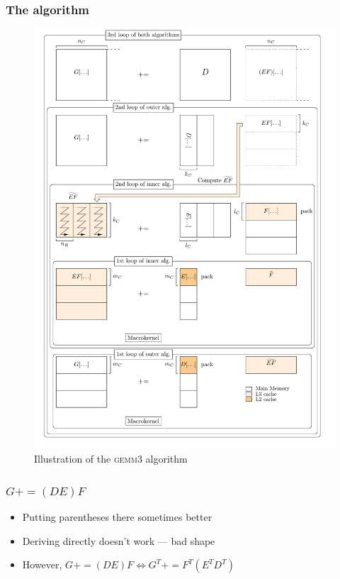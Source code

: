 \documentclass{beamer}
\newcommand*{\pluseq}{\mathrel{{+}{=}}}
\newcommand*{\gemmt}{{\textsc{gemm3}}}
\begin{document}
\begin{frame}
  \frametitle{The algorithm}
  \begin{figure}
    \centering
    \includegraphics[height=0.875\textheight]{gemm3-picture}
    \caption{Illustration of the \gemmt{} algorithm}
    \label{fig:gemm3}
\end{figure}
\end{frame}

\begin{frame}
  \frametitle{$G \pluseq (DE)F$}
    \begin{adjustbox}{max size={!}{0.5\textheight},center}
  \end{adjustbox}
  \begin{itemize}
  \item Putting parentheses there sometimes better
  \item Deriving directly doesn't work --- bad shape
  \item However, $G \pluseq (DE)F \Leftrightarrow G^T \pluseq F^T(E^TD^T)$
  \end{itemize}
\end{frame}
\end{document}
